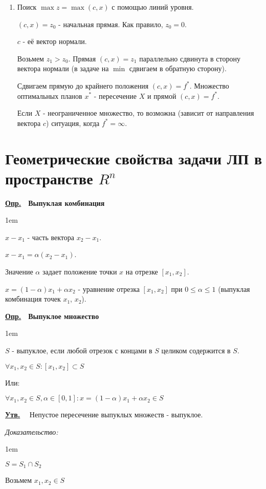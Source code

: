 \documentclass[11pt]{article}
\newenvironment{df}[1]{
  \underline{\textbf{Опр.}}\ \ \textbf{#1}
  
  \begin{adjustwidth}{1em}{}
}{
  \end{adjustwidth}
}
\newenvironment{proof}{
  \textit{Доказательство:}
    
  \begin{adjustwidth}{1em}{}
}{
  \end{adjustwidth}
}
\newenvironment{statement}{
  \underline{\textbf{Утв.}}\ \ }{
  
}
\begin{document}
\begin{sloppypar}
\begin{enumerate}
  \item Поиск $\max z = \max (c, x)$ с помощью линий уровня.
  
  $(c, x) = z_0$ - начальная прямая. Как правило, $z_0 = 0$.
  
  $c$ - её вектор нормали.
  
  Возьмем $z_1 > z_0$. Прямая $(c, x) = z_1$ параллельно сдвинута в сторону вектора нормали (в задаче на $\min$ сдвигаем в обратную сторону).
  
  Сдвигаем прямую до крайнего положения $(c, x) = f^*$. Множество оптимальных планов $x^*$ - пересечение $X$ и прямой $(c, x) = f^*$.
  
  Если $X$ - неограниченное множество, то возможна (зависит от направления вектора $c$) ситуация, когда $f^* = \infty$.
\end{enumerate}

\section*{Геометрические свойства задачи ЛП в пространстве $R^n$}
\begin{df}{Выпуклая комбинация}

  $x - x_1$ - часть вектора $x_2 - x_1$.
  
  $x - x_1 = \alpha(x_2 - x_1)$.
  
  Значение $\alpha$ задает положение точки $x$ на отрезке $[x_1, x_2]$.
  
  $x = (1 - \alpha)x_1 + \alpha x_2$ - уравнение отрезка $[x_1, x_2]$ при $0 \leq \alpha \leq 1$ (выпуклая комбинация точек $x_1$, $x_2$).
\end{df}

\begin{df}{Выпуклое множество}
  $S$ - выпуклое, если любой отрезок с концами в $S$ целиком содержится в $S$.
  
  $\forall x_1, x_2 \in S: [x_1, x_2] \subset S$
  
  Или:
  
  $\forall x_1, x_2 \in S, \alpha \in [0, 1]: x = (1 - \alpha)x_1 + \alpha x_2 \in S$
\end{df}

\begin{statement}
  Непустое пересечение выпуклых множеств - выпуклое.
\end{statement}
\begin{proof}
  $S = S_1 \cap S_2$

  Возьмем $x_1, x_2 \in S$
  

\end{proof}
\end{sloppypar}
\end{document}

